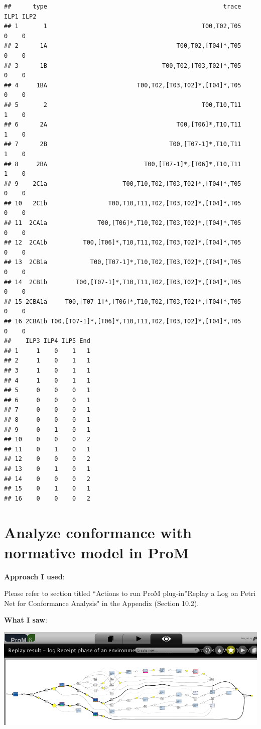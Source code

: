 \documentclass[]{article}
\begin{document}
\begin{verbatim}
##      type                                                 trace ILP1 ILP2
## 1       1                                           T00,T02,T05    0    0
## 2      1A                                    T00,T02,[T04]*,T05    0    0
## 3      1B                                T00,T02,[T03,T02]*,T05    0    0
## 4     1BA                         T00,T02,[T03,T02]*,[T04]*,T05    0    0
## 5       2                                           T00,T10,T11    1    0
## 6      2A                                    T00,[T06]*,T10,T11    1    0
## 7      2B                                  T00,[T07-1]*,T10,T11    1    0
## 8     2BA                           T00,[T07-1]*,[T06]*,T10,T11    1    0
## 9    2C1a                     T00,T10,T02,[T03,T02]*,[T04]*,T05    0    0
## 10   2C1b                 T00,T10,T11,T02,[T03,T02]*,[T04]*,T05    0    0
## 11  2CA1a              T00,[T06]*,T10,T02,[T03,T02]*,[T04]*,T05    0    0
## 12  2CA1b          T00,[T06]*,T10,T11,T02,[T03,T02]*,[T04]*,T05    0    0
## 13  2CB1a            T00,[T07-1]*,T10,T02,[T03,T02]*,[T04]*,T05    0    0
## 14  2CB1b        T00,[T07-1]*,T10,T11,T02,[T03,T02]*,[T04]*,T05    0    0
## 15 2CBA1a     T00,[T07-1]*,[T06]*,T10,T02,[T03,T02]*,[T04]*,T05    0    0
## 16 2CBA1b T00,[T07-1]*,[T06]*,T10,T11,T02,[T03,T02]*,[T04]*,T05    0    0
##    ILP3 ILP4 ILP5 End
## 1     1    0    1   1
## 2     1    0    1   1
## 3     1    0    1   1
## 4     1    0    1   1
## 5     0    0    0   1
## 6     0    0    0   1
## 7     0    0    0   1
## 8     0    0    0   1
## 9     0    1    0   1
## 10    0    0    0   2
## 11    0    1    0   1
## 12    0    0    0   2
## 13    0    1    0   1
## 14    0    0    0   2
## 15    0    1    0   1
## 16    0    0    0   2
\end{verbatim}

\section{Analyze conformance with normative model in
ProM}\label{analyze-conformance-with-normative-model-in-prom}

\textbf{Approach I used}:

Please refer to section titled ``Actions to run ProM plug-in''Replay a
Log on Petri Net for Conformance Analysis" in the Appendix (Section
10.2).

\textbf{What I saw}:

\includegraphics{CoSeLoG_Step_06_PetriNet_Normative_Conformance.png}
\end{document}
